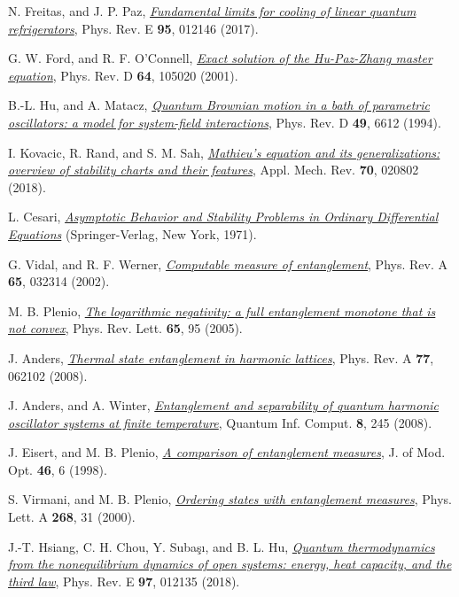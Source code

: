\documentclass[11pt,a4paper]{article}
\begin{document}
\begin{thebibliography}{99}
    N. Freitas, and J. P. Paz, \href{https://doi.org/10.1103/PhysRevE.95.012146}{\textit{Fundamental limits for cooling of linear quantum refrigerators}}, Phys. Rev. E \textbf{95}, 012146 (2017).

    G. W. Ford, and R. F. O'Connell, \href{https://doi.org/10.1103/PhysRevD.64.105020}{\textit{Exact solution of the Hu-Paz-Zhang master equation}}, Phys. Rev. D \textbf{64}, 105020 (2001).

    B.-L. Hu, and A. Matacz, \href{https://doi.org/10.1103/PhysRevD.49.6612}{\textit{Quantum Brownian motion in a bath of parametric oscillators: a model for system-field interactions}}, Phys. Rev. D \textbf{49}, 6612 (1994).

    I. Kovacic, R. Rand, and S. M. Sah, \href{ https://doi.org/10.1115/1.4039144}{\textit{Mathieu's equation and its generalizations: overview of stability charts and their features}}, Appl. Mech. Rev. \textbf{70}, 020802 (2018).

    L. Cesari, \href{https://doi.org/10.1007/978-3-642-85671-6}{\textsl{Asymptotic Behavior and Stability Problems in Ordinary Differential Equations}} (Springer-Verlag, New York, 1971).

    G. Vidal, and R. F. Werner, \href{https://doi.org/10.1103/PhysRevA.65.032314}{\textit{Computable measure of entanglement}}, Phys. Rev. A \textbf{65}, 032314 (2002).

    M. B. Plenio, \href{https://doi.org/10.1103/PhysRevLett.95.090503}{\textit{The logarithmic negativity: a full entanglement monotone that is not convex}}, Phys. Rev. Lett. \textbf{65}, 95 (2005).

    J. Anders, \href{https://doi.org/10.1103/PhysRevA.77.062102}{\textit{Thermal state entanglement in harmonic lattices}}, Phys. Rev. A \textbf{77}, 062102 (2008).

    J. Anders, and A. Winter, \href{https://doi.org/10.5555/2011763.2011765}{\textit{Entanglement and separability of quantum harmonic oscillator systems at finite temperature}}, Quantum Inf. Comput. \textbf{8}, 245 (2008).

    J. Eisert, and M. B. Plenio, \href{https://doi.org/10.1080/09500349908231260}{\textit{A comparison of entanglement measures}}, J. of Mod. Opt. \textbf{46}, 6 (1998).

    S. Virmani, and M. B. Plenio, \href{https://doi.org/10.1016/S0375-9601(00)00157-2}{\textit{Ordering states with entanglement measures}}, Phys. Lett. A \textbf{268}, 31 (2000).

    J.-T. Hsiang, C. H. Chou, Y. Suba\c{s}{\i}, and B. L. Hu, \href{https://doi.org/10.1103/PhysRevE.97.012135}{\textit{Quantum thermodynamics from the nonequilibrium dynamics of open systems: energy, heat capacity, and the third law}}, Phys. Rev. E \textbf{97}, 012135 (2018).


\end{thebibliography}
\end{document}
